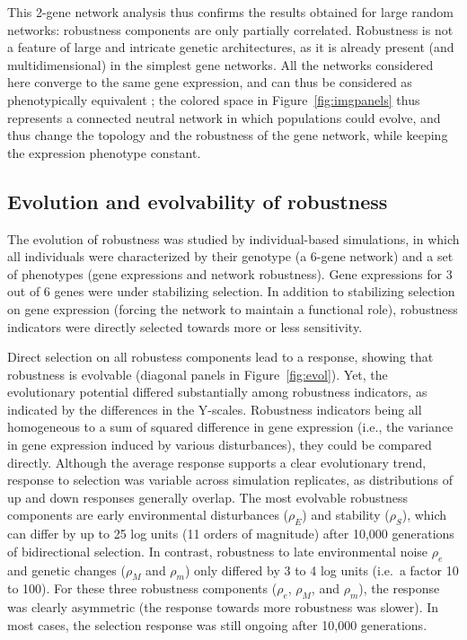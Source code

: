 \documentclass[10pt,a4paper]{article}
\newcommand{\stability}{{\rho_S}}
\newcommand{\earlyenv}{{\rho_E}}
\newcommand{\lateenv}{{\rho_e}}
\newcommand{\earlymut}{{\rho_M}}
\newcommand{\latemut}{{\rho_m}}
\begin{document}
This 2-gene network analysis thus confirms the results obtained for large random networks: robustness components are only partially correlated. Robustness is not a feature of large and intricate genetic architectures, as it is already present (and multidimensional) in the simplest gene networks. All the networks considered here converge to the same gene expression, and can thus be considered as phenotypically equivalent ; the colored space in Figure~\ref{fig:imgpanels} thus represents a connected neutral network in which populations could evolve, and thus change the topology and the robustness of the gene network, while keeping the expression phenotype constant. 

\subsection{Evolution and evolvability of robustness}

The evolution of robustness was studied by individual-based simulations, in which all individuals were characterized by their genotype (a 6-gene network) and a set of phenotypes (gene expressions and network robustness). Gene expressions for 3 out of 6 genes were under stabilizing selection. In addition to stabilizing selection on gene expression (forcing the network to maintain a functional role), robustness indicators were directly selected towards more or less sensitivity. 

Direct selection on all robustess components lead to a response, showing that robustness is evolvable (diagonal panels in Figure~\ref{fig:evol}). Yet, the evolutionary potential differed substantially among robustness indicators, as indicated by the differences in the Y-scales. Robustness indicators being all homogeneous to a sum of squared difference in gene expression (i.e., the variance in gene expression induced by various disturbances), they could be compared directly. Although the average response supports a clear evolutionary trend, response to selection was variable across simulation replicates, as distributions of up and down responses generally overlap. The most evolvable robustness components are early environmental disturbances ($\earlyenv$) and stability ($\stability$), which can differ by up to 25 log units (11 orders of magnitude) after 10,000 generations of bidirectional selection. In contrast, robustness to late environmental noise $\lateenv$ and genetic changes ($\earlymut$ and $\latemut$) only differed by 3 to 4 log units (i.e.\ a factor 10 to 100). For these three robustness components ($\lateenv$, $\earlymut$, and $\latemut$), the response was clearly asymmetric (the response towards more robustness was slower). In most cases, the selection response was still ongoing after 10,000 generations. 
\end{document}
